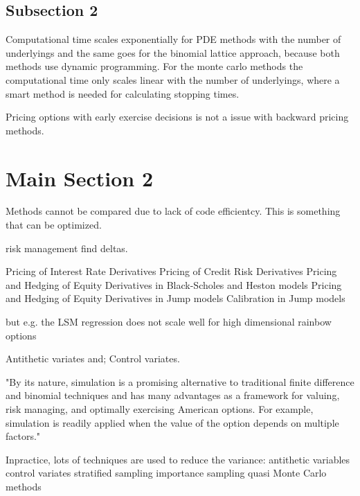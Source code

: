 
\subsection{Subsection 2}
Computational time scales exponentially for PDE methods with the number of underlyings and the same goes for the binomial lattice approach, because both methods use dynamic programming. For the monte carlo methods the computational time only scales linear with the number of underlyings, where a smart method is needed for calculating stopping times.

Pricing options with early exercise decisions is not a issue with backward pricing methods.


\section{Main Section 2}
\parencite{liaw2018tune}
\parencite{FergusonRyan2018}

Methods cannot be compared due to lack of code efficientcy. This is something that can be optimized. 

risk management find deltas.


    Pricing of Interest Rate Derivatives
    Pricing of Credit Risk Derivatives
    Pricing and Hedging of Equity Derivatives in Black-Scholes and Heston models
    Pricing and Hedging of Equity Derivatives in Jump models
    Calibration in Jump models
    
    but e.g. the LSM regression does not scale well for high dimensional rainbow options



    Antithetic variates and;
    Control variates.


"By its nature, simulation is a promising alternative to traditional finite difference and binomial techniques and has many advantages as a framework for valuing, risk managing, and optimally exercising American options. For example, simulation is readily applied when the value of the option depends on multiple factors."


Inpractice, lots of techniques are used to reduce the variance:
antithetic variables 
control variates
stratified sampling
importance sampling
quasi Monte Carlo methods
